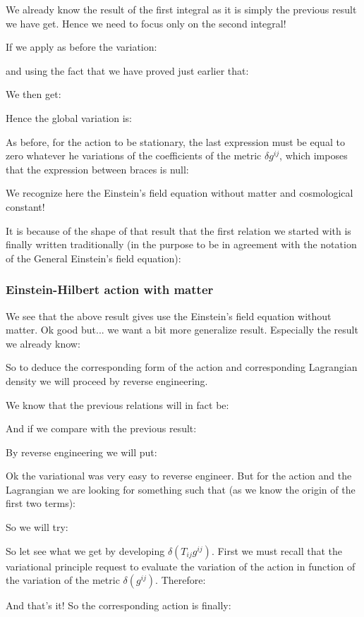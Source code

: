 	We already know the result of the first integral as it is simply the previous result we have get. Hence we need to focus only on the second integral!
	
	If we apply as before the variation:
	
	and using the fact that we have proved just earlier that:
	
	We then get:
	
	Hence the global variation is:
	
	As before, for the action to be stationary, the last expression must be equal to zero whatever he variations of the coefficients of the metric $\delta g^{ij}$, which imposes that the expression between braces is null:
	
	We recognize here the Einstein's field equation without matter and cosmological constant!
	
	It is because of the shape of that result that the first relation we started with is finally written traditionally (in the purpose to be in agreement with the notation of the General Einstein's field equation):
	
	
	\subsubsection{Einstein-Hilbert action with matter}
	We see that the above result gives use the Einstein's field equation without matter. Ok good but... we want a bit more generalize result. Especially the result we already know:
	
	So to deduce the corresponding form of the action and corresponding Lagrangian density we will proceed by reverse engineering.
	
	We know that the previous relations will in fact be:
	
	And if we compare with the previous result:
	
	By reverse engineering we will put:
	
	Ok the variational was very easy to reverse engineer. But for the action and the Lagrangian we are looking for something such that (as we know the origin of the first two terms):
	
	So we will try:
	
	So let see what we get by developing $\delta\left(T_{ij}g^{ij}\right)$. First we must recall that the variational principle request to evaluate the variation of the action in function of the variation of the metric $\delta(g^{ij})$. Therefore:
	
	And that's it! So the corresponding action is finally:
	
